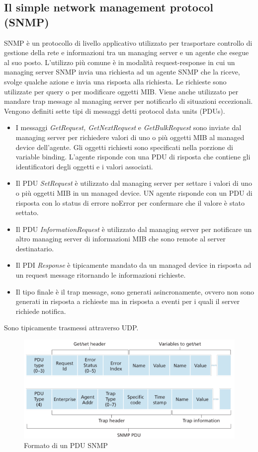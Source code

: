 \subsection{Il simple network management protocol (SNMP)}
SNMP \`e un protocollo di livello applicativo utilizzato per trasportare controllo di gestione della rete e informazioni  tra un managing server e un agente che esegue al suo posto. L'utilizzo pi\`u comune \`e in
modalit\`a request-response in cui un managing server SNMP invia una richiesta ad un agente SNMP che la riceve, svolge qualche azione e invia una risposta alla richiesta. Le richieste sono utilizzate per query o 
per modificare oggetti MIB. Viene anche utilizzato per mandare trap message al managing server per notificarlo di situazioni eccezionali. Vengono definiti sette tipi di messaggi detti protocol data units (PDUs).
\begin{itemize}
\item I messaggi \emph{GetRequest, GetNextRequest} e \emph{GetBulkRequest} sono inviate dal managing server per richiedere valori di uno o pi\`u oggetti MIB al managed device dell'agente. Gli oggetti 
richiesti sono specificati nella porzione di variable binding. L'agente risponde con una PDU di risposta che contiene gli identificatori degli oggetti e i valori associati.
\item Il PDU \emph{SetRequest} \`e utilizzato dal managing server per settare i valori di uno o pi\`u oggetti MIB in un managed device. UN agente risponde con un PDU di risposta con lo status di errore
noError per confermare che il valore \`e stato settato. 
\item Il PDU \emph{InformationRequest} \`e utilizzato dal managing server per notificare un altro managing server di informazioni MIB che sono remote al server destinatario.
\item Il PDI \emph{Response} \`e tipicamente mandato da un managed device in risposta ad un request message ritornando le informazioni richieste.
\item Il tipo finale \`e il trap message, sono generati asincronamente, ovvero non sono generati in risposta a richieste ma in risposta a eventi per i quali il server richiede notifica. 
\end{itemize}
Sono tipicamente trasmessi attraverso UDP.
\begin{figure}[h]
\includegraphics[width=\textwidth]{Pictures/SNMPPDUFormato.png}
\caption{Formato di un PDU SNMP}
\end{figure}
